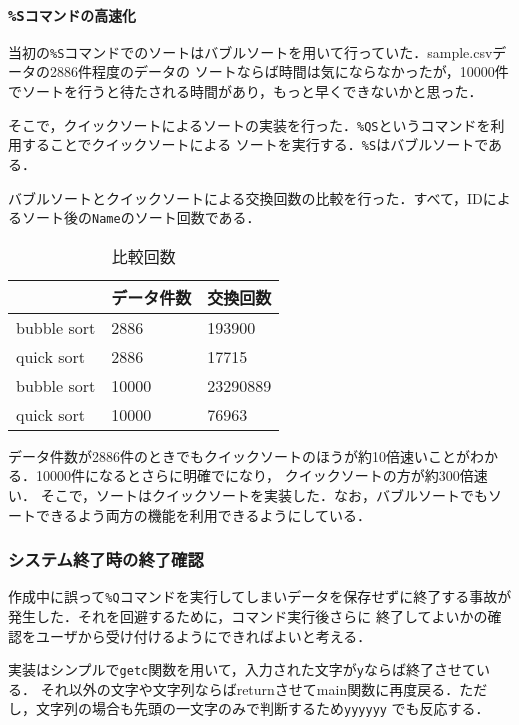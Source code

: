 \documentclass[a4j,11pt]{jarticle}
\begin{document}
\subsubsection{\texttt{\%Sコマンドの高速化}}
当初の\verb|%S|コマンドでのソートはバブルソートを用いて行っていた．sample.csvデータの2886件程度のデータの
ソートならば時間は気にならなかったが，10000件でソートを行うと待たされる時間があり，もっと早くできないかと思った．

そこで，クイックソートによるソートの実装を行った．\verb|%QS|というコマンドを利用することでクイックソートによる
ソートを実行する．\verb|%S|はバブルソートである．

バブルソートとクイックソートによる交換回数の比較を行った．すべて，IDによるソート後の\verb|Name|のソート回数である．
\begin{table}[t]
    \centering %
    \caption{比較回数}
\begin{tabular}{|l|l|l|}
\hline
            & データ件数 & 交換回数     \\ \hline
bubble sort & 2886  & 193900   \\ \hline
quick sort  & 2886  & 17715    \\ \hline
bubble sort & 10000 & 23290889 \\ \hline
quick sort  & 10000 & 76963    \\ \hline
\end{tabular}
\end{table}

データ件数が2886件のときでもクイックソートのほうが約10倍速いことがわかる．10000件になるとさらに明確でになり，
クイックソートの方が約300倍速い．
そこで，ソートはクイックソートを実装した．なお，バブルソートでもソートできるよう両方の機能を利用できるようにしている．
\subsubsection{システム終了時の終了確認}
作成中に誤って\verb|%Q|コマンドを実行してしまいデータを保存せずに終了する事故が発生した．それを回避するために，コマンド実行後さらに
終了してよいかの確認をユーザから受け付けるようにできればよいと考える．

実装はシンプルで\verb|getc|関数を用いて，入力された文字が\verb|y|ならば終了させている．
それ以外の文字や文字列ならばreturnさせてmain関数に再度戻る．ただし，文字列の場合も先頭の一文字のみで判断するため\verb|yyyyyy|
でも反応する．
\end{document}
